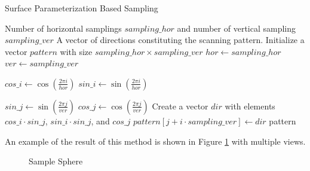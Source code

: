 \documentclass[11pt, a4paper,oneside,chapterprefix=false]{scrbook}
\begin{document}
\begin{algorithm}[H] 
\label{alg:surface parameterization based sampling}
\caption{Surface Parameterization Based Sampling}
\begin{algorithmic}[1]
    \Require Number of horizontal samplings \(sampling\_hor\) and number of vertical sampling \(sampling\_ver\)
    \Ensure A vector of directions constituting the scanning pattern.
        \State Initialize a vector \(pattern\) with size \(sampling\_hor \times sampling\_ver\)
        \State \(hor \gets sampling\_hor\)
        \State \(ver \gets sampling\_ver\)
        
            \State \(cos\_i \gets \cos\left(\frac{2\pi i}{hor}\right)\)
            \State \(sin\_i \gets \sin\left(\frac{2\pi i}{hor}\right)\)
            
                \State \(sin\_j \gets \sin\left(\frac{2\pi j}{ver}\right)\)
                \State \(cos\_j \gets \cos\left(\frac{2\pi j}{ver}\right)\)
                \State Create a vector \(dir\) with elements \(cos\_i \cdot sin\_j\), \(sin\_i \cdot sin\_j\), and \(cos\_j\)
                \State \(pattern[j + i \cdot sampling\_ver] \gets dir\)
            \EndFor
        \EndFor
        \State \Return pattern
\end{algorithmic}
\end{algorithm}

An example of the result of this method is shown in Figure \ref{fig:sample sphere} with multiple views. 

\begin{figure}[H]
    \centering
     \label{fig:frontal view} \hfill
     \label{fig:view from above}
    \caption{Sample Sphere}
    \label{fig:sample sphere}
\end{figure}
\end{document}
